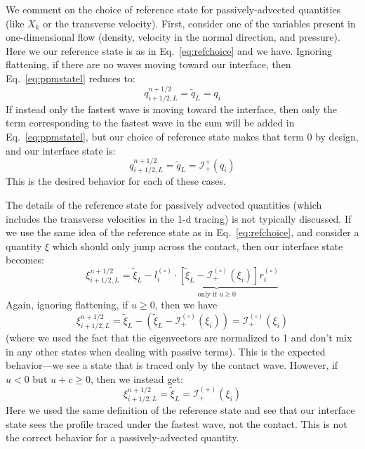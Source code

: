 \documentclass{emulateapj}
\newcommand{\evz}{{(\circ)}}
\newcommand{\evp}{{(+)}}
\begin{document}
We comment on the choice of reference state for passively-advected
quantities (like $X_k$ or the transverse velocity).
First, consider one of the variables present in one-dimensional flow
(density, velocity in the normal direction, and pressure).  Here we
our reference state is as in Eq.~\ref{eq:refchoice} and we have.
Ignoring flattening, if there are no waves moving toward our
interface, then Eq.~\ref{eq:ppmstatel} reduces to:
\begin{equation}
q_{i+1/2,L}^{n+1/2} = \tilde{q}_L = q_i
\end{equation}
If instead only the fastest wave is moving toward the interface, then
only the term corresponding to the fastest wave in the sum will be
added in Eq.~\ref{eq:ppmstatel}, but our choice of reference state makes
that term 0 by design, and our interface state is:
\begin{equation}
q_{i+1/2,L}^{n+1/2} = \tilde{q}_L = \mathcal{I}_+^{+}(q_i)
\end{equation}
This is the desired behavior for each of these cases. 

The details of the reference state for passively advected quantities 
(which includes the transverse velocities in the 1-d tracing) is not
typically discussed.  If we use the same idea of the reference state as
in Eq.~\ref{eq:refchoice}, and consider a quantity $\xi$ which should only
jump across the contact, then our interface state becomes:
\begin{equation}
\xi_{i+1/2,L}^{n+1/2} = \tilde{\xi}_L -
  \underbrace{l_i^\evz \cdot \left [
        \tilde{\xi}_L  - \mathcal{I}^\evz_+(\xi_i)
       \right ] r_i^\evz}_{\text{only if~$u \ge 0$}}
\end{equation}
Again, ignoring flattening, if $u \ge 0$, then we have
\begin{equation}
\xi_{i+1/2,L}^{n+1/2} = \tilde{\xi}_L -
  \left (\tilde{\xi}_L  - \mathcal{I}^\evz_+(\xi_i) \right ) = \mathcal{I}^\evz_+(\xi_i)
\end{equation}
(where we used the fact that the eigenvectors are normalized to 1 and
don't mix in any other states when dealing with passive terms).  This
is the expected behavior---we see a state that is traced only by the
contact wave.  However, if $u < 0$ but $u + c \ge 0$, then we instead get:
\begin{equation}
\xi_{i+1/2,L}^{n+1/2} = \tilde{\xi}_L = \mathcal{I}^\evp_+(\xi_i)
\end{equation}
Here we used the same definition of the reference state and see that our
interface state sees the profile traced under the fastest wave, not the
contact.  This is not the correct behavior for a passively-advected
quantity.  
\end{document}
